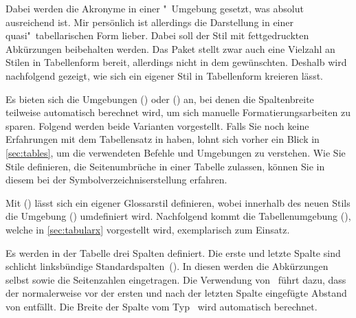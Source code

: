 \documentclass[%
  english,ngerman,%
  cdgeometry=no,DIV=12,%
  automark,%
  listof=toc,%
]{tudscrartcl}
\begin{document}
\begin{quoting}[rightmargin=0pt]
\glsdisablehyper
\printacronyms[style=simple]
\end{quoting}
%
Dabei werden die Akronyme in einer "~Umgebung gesetzt,
was absolut ausreichend ist. Mir persönlich ist allerdings die Darstellung in 
einer quasi"~tabellarischen Form lieber. Dabei soll der Stil mit fettgedruckten 
Abkürzungen beibehalten werden. Das Paket  stellt zwar 
auch eine Vielzahl an Stilen in Tabellenform bereit, allerdings nicht in dem 
gewünschten. Deshalb wird nachfolgend gezeigt, wie sich ein eigener Stil in 
Tabellenform kreieren lässt.

Es bieten sich die Umgebungen () oder 
() an, bei denen die Spaltenbreite teilweise 
automatisch berechnet wird, um sich manuelle Formatierungsarbeiten zu sparen. 
Folgend werden beide Varianten vorgestellt. Falls Sie noch keine Erfahrungen 
mit dem Tabellensatz in  haben, lohnt sich vorher ein Blick in 
\autoref{sec:tables}, um die verwendeten Befehle und Umgebungen zu verstehen. 
Wie Sie Stile definieren, die Seitenumbrüche in einer Tabelle zulassen, können 
Sie in diesem  bei der Symbolverzeichniserstellung 
erfahren.

Mit () lässt sich ein eigener 
Glossarstil definieren, wobei innerhalb des neuen Stils die Umgebung 
() umdefiniert wird. Nachfolgend 
kommt die Tabellenumgebung (), welche 
in \autoref{sec:tabularx} vorgestellt wird, exemplarisch zum Einsatz.

Es werden in der Tabelle drei Spalten definiert. Die erste und letzte Spalte 
sind schlicht linksbündige Standardspalten~(). In diesen werden die 
Abkürzungen selbst sowie die Seitenzahlen eingetragen. Die Verwendung 
von~ führt dazu, dass der normalerweise vor der ersten 
und nach der letzten Spalte eingefügte Abstand von  entfällt. 
Die Breite der Spalte vom Typ~ wird automatisch berechnet.
\end{document}
